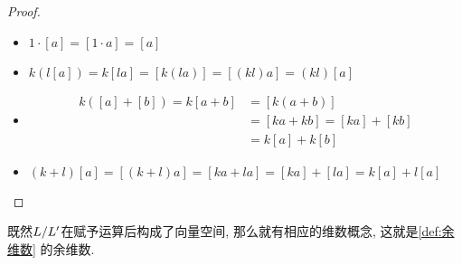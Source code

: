 \begin{proof}
\begin{step}
\begin{itemize}
                    \item $1\cdot [a]=[1\cdot a]=[a]$
                    \item $k(l[a])=k[la]=[k(la)]=[(kl)a]=(kl)[a]$
                    \item \begin{align*}
                        k([a]+[b])=k[a+b]&=[k(a+b)]\\
                        &=[ka+kb]=[ka]+[kb]\\
                        &=k[a]+k[b]
                    \end{align*}
                    \item $(k+l)[a]=[(k+l)a]=[ka+la]=[ka]+[la]=k[a]+l[a]$\qedhere
                \end{itemize} 
        \end{step}
    \end{proof}
    \begin{remark}
        既然$L/L^{\prime}$在赋予运算后构成了向量空间, 那么就有相应的维数概念, 这就是\autoref{def:余维数} 的余维数.
    \end{remark}

